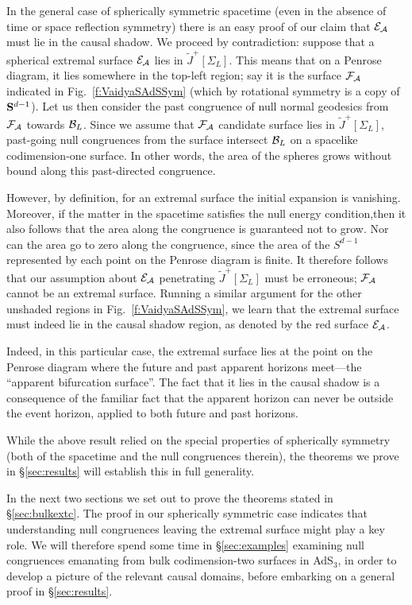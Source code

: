 \documentclass[12pt]{article}
\def\bulkJ{{\tilde J}}
\def\AdS#1{\AdS$_{#1}$}
\def\bdy{{\cal B}}
\def\regA{{\cal A}}
\def\extr{{\cal E}_\regA}
\def\AdS#1{AdS$_{#1}$}
\begin{document}
In the general case of spherically symmetric spacetime (even in the absence of time or space reflection symmetry) there is an easy proof of our claim that $\extr$ must lie in the causal shadow.
We proceed by contradiction: suppose that a spherical extremal surface $\extr$ lies in $\bulkJ^+\left[\Sigma_L\right]$. This means that 
on a Penrose diagram, it lies somewhere in the top-left region; say it is the surface ${\cal F}_\regA$ indicated in Fig.~\ref{f:VaidyaSAdSSym} (which by rotational symmetry is a copy of ${\bf S}^{d-1}$). Let us then consider the past congruence of null normal geodesics from ${\cal F}_\regA$ towards $\bdy_L$. Since we assume that ${\cal F}_\regA$ candidate surface lies in $\bulkJ^+\left[\Sigma_L\right]$, past-going null congruences from the surface intersect $\bdy_L$ on a spacelike codimension-one surface. In other words, the area of the spheres grows without bound along this past-directed congruence.

However,  by definition, for an extremal surface the initial expansion is vanishing. Moreover, if the matter in the spacetime satisfies the null energy condition,then it also follows that the area along the congruence is guaranteed not to grow. Nor can the area go to zero along the congruence, since the area of the $S^{d-1}$ represented by each point on the Penrose diagram is finite. It therefore follows that our assumption about $\extr$ penetrating $\bulkJ^+\left[\Sigma_L\right]$ must be erroneous; ${\cal F}_\regA$ cannot be an extremal surface. Running a similar argument for the other unshaded regions in Fig.~\ref{f:VaidyaSAdSSym}, we learn that the extremal surface must indeed lie in the causal shadow region, as denoted by the red surface $\extr$.

Indeed, in this particular case, the extremal surface lies at the point on the Penrose diagram where the future and past apparent horizons meet---the ``apparent bifurcation surface''. The fact that it lies in the causal shadow is a consequence of the familiar fact that the apparent horizon can never be outside the event horizon, applied to both future and past horizons.

While the above result relied on the special properties of spherically symmetry (both of the spacetime and the null congruences therein), the theorems we prove in \S\ref{sec:results} will establish this in full generality.

In the next two sections we set out to prove the theorems stated in \S\ref{sec:bulkextc}.  The proof in our spherically symmetric case indicates that understanding null congruences leaving the extremal surface might play a key role.  We will therefore spend some time in \S\ref{sec:examples} examining null congruences emanating from bulk codimension-two surfaces in \AdS{3}, in order to develop a picture of the relevant causal domains, before embarking on a general proof in \S\ref{sec:results}.
\end{document}
